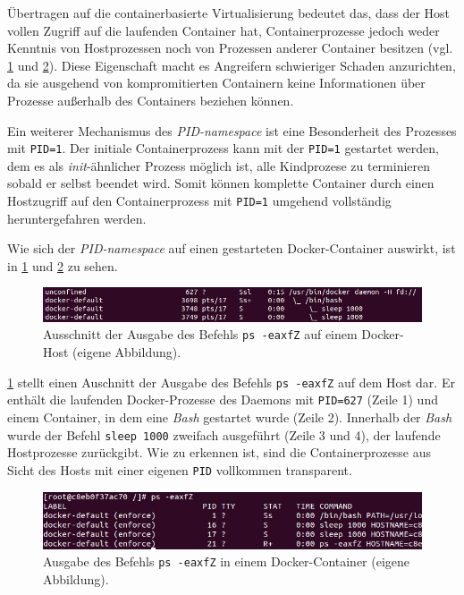 \documentclass[../main.tex]{subfiles}
\begin{document}
			Übertragen auf die containerbasierte Virtualisierung bedeutet das, dass der Host vollen Zugriff auf die laufenden Container hat, Containerprozesse jedoch weder Kenntnis von Hostprozessen noch von Prozessen anderer Container besitzen (vgl. \fig \ref{fig:sec_pidNsHost} und \fig \ref{fig:sec_pidNsContainer}). Diese Eigenschaft macht es Angreifern schwieriger Schaden anzurichten, da sie ausgehend von kompromitierten Containern keine Informationen über Prozesse außerhalb des Containers beziehen können.

			Ein weiterer Mechanismus des \emph{\acrshort{PID}-namespace} ist eine Besonderheit des Prozesses mit \texttt{PID=1}. Der initiale Containerprozess kann mit der \texttt{PID=1} gestartet werden, dem es als \emph{init}-ähnlicher Prozess möglich ist, alle Kindprozese zu terminieren sobald er selbst beendet wird. Somit können komplette Container durch einen Hostzugriff auf den Containerprozess mit \texttt{PID=1} umgehend vollständig heruntergefahren werden.

			Wie sich der \emph{\acrshort{PID}-namespace} auf einen gestarteten Docker-Container auswirkt, ist in \fig \ref{fig:sec_pidNsHost} und \fig \ref{fig:sec_pidNsContainer} zu sehen.

			\begin{figure}[h]
					\centering
					\includegraphics[width=1.0\textwidth]{./images/sec_pidNsHost.jpg}
					\caption{Ausschnitt der Ausgabe des Befehls \texttt{ps -eaxfZ} auf einem Docker-Host (eigene Abbildung).}
					\label{fig:sec_pidNsHost}
			\end{figure}

			\fig \ref{fig:sec_pidNsHost} stellt einen Auschnitt der Ausgabe des Befehls \texttt{ps -eaxfZ} auf dem Host dar. Er enthält die laufenden Docker-Prozesse des Daemons mit \texttt{PID=627} (Zeile 1) und einem Container, in dem eine \emph{Bash} gestartet wurde (Zeile 2). Innerhalb der \emph{Bash} wurde der Befehl \texttt{sleep 1000} zweifach ausgeführt (Zeile 3 und 4), der laufende Hostprozesse zurückgibt. Wie zu erkennen ist, sind die Containerprozesse aus Sicht des Hosts mit einer eigenen \texttt{PID} vollkommen transparent.

			\begin{figure}[h]
					\centering
					\includegraphics[width=1.0\textwidth]{./images/sec_pidNsContainer.jpg}
					\caption{Ausgabe des Befehls \texttt{ps -eaxfZ} in einem Docker-Container (eigene Abbildung).}
					\label{fig:sec_pidNsContainer}
			\end{figure}
\end{document}
